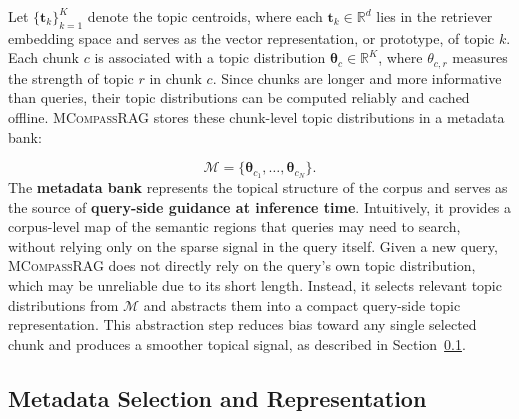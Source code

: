 \documentclass{llmxive}
\providecommand{\name}[1]{\textsc{MCompassRAG}\xspace}
\begin{document}
Let $\{\mathbf{t}_k\}_{k=1}^{K}$ denote the topic centroids, where each $\mathbf{t}_k \in \mathbb{R}^{d}$ lies in the retriever embedding space and serves as the vector representation, or prototype, of topic $k$. Each chunk $c$ is associated with a topic distribution $\boldsymbol{\theta}_c \in \mathbb{R}^{K}$, where $\theta_{c,r}$ measures the strength of topic $r$ in chunk $c$. Since chunks are longer and more informative than queries, their topic distributions can be computed reliably and cached offline. \name{} stores these chunk-level topic distributions in a metadata bank:

\begin{equation}
    \mathcal{M} = \{\boldsymbol{\theta}_{c_1}, \ldots, \boldsymbol{\theta}_{c_N}\}.
\end{equation}
The \textbf{metadata bank} represents the topical structure of the corpus and serves as the source of \textbf{query-side guidance at inference time}. Intuitively, it provides a corpus-level map of the semantic regions that queries may need to search, without relying only on the sparse signal in the query itself. Given a new query, \name{} does not directly rely on the query's own topic distribution, which may be unreliable due to its short length. Instead, it selects relevant topic distributions from $\mathcal{M}$ and abstracts them into a compact query-side topic representation. This abstraction step reduces bias toward any single selected chunk and produces a smoother topical signal, as described in Section~\ref{sec:selection_representation}.

\subsection{Metadata Selection and Representation}
\label{sec:selection_representation}
\end{document}
